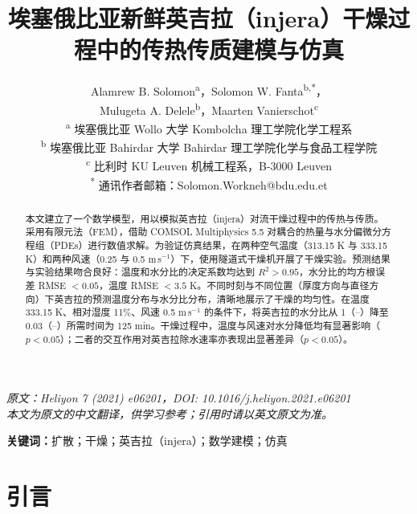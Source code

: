 \documentclass[11pt,a4paper]{ctexart}
\title{\bfseries 埃塞俄比亚新鲜英吉拉（injera）干燥过程中的传热传质建模与仿真}
\author{
  Alamrew B. Solomon\textsuperscript{a}，Solomon W. Fanta\textsuperscript{b,*}，\\
  Mulugeta A. Delele\textsuperscript{b}，Maarten Vanierschot\textsuperscript{c}\\[4pt]
  \small \textsuperscript{a} 埃塞俄比亚 Wollo 大学 Kombolcha 理工学院化学工程系\\
  \small \textsuperscript{b} 埃塞俄比亚 Bahirdar 大学 Bahirdar 理工学院化学与食品工程学院\\
  \small \textsuperscript{c} 比利时 KU Leuven 机械工程系，B-3000 Leuven\\
  \small \textsuperscript{*} 通讯作者邮箱：Solomon.Workneh@bdu.edu.et
}
\date{}
\begin{document}
\maketitle

\begin{center}
\small
\textit{原文：Heliyon 7 (2021) e06201，DOI: 10.1016/j.heliyon.2021.e06201}\\
\textit{本文为原文的中文翻译，供学习参考；引用时请以英文原文为准。}
\end{center}

\vspace{4pt}
\noindent\textbf{关键词：}扩散；干燥；英吉拉（injera）；数学建模；仿真

\begin{abstract}
\noindent
本文建立了一个数学模型，用以模拟英吉拉（injera）对流干燥过程中的传热与传质。采用有限元法（FEM），借助 COMSOL Multiphysics 5.5 对耦合的热量与水分偏微分方程组（PDEs）进行数值求解。为验证仿真结果，在两种空气温度（313.15 K 与 333.15 K）和两种风速（0.25 与 0.5 m\,s$^{-1}$）下，使用隧道式干燥机开展了干燥实验。预测结果与实验结果吻合良好：温度和水分比的决定系数均达到 $R^2>0.95$，水分比的均方根误差 RMSE $<0.05$，温度 RMSE $<3.5$ K。不同时刻与不同位置（厚度方向与直径方向）下英吉拉的预测温度分布与水分比分布，清晰地展示了干燥的均匀性。在温度 333.15 K、相对湿度 11\%、风速 0.5 m\,s$^{-1}$ 的条件下，将英吉拉的水分比从 1（--）降至 0.03（--）所需时间为 125 min。干燥过程中，温度与风速对水分降低均有显著影响（$p<0.05$）；二者的交互作用对英吉拉除水速率亦表现出显著差异（$p<0.05$）。
\end{abstract}

\section{引言}
\end{document}
